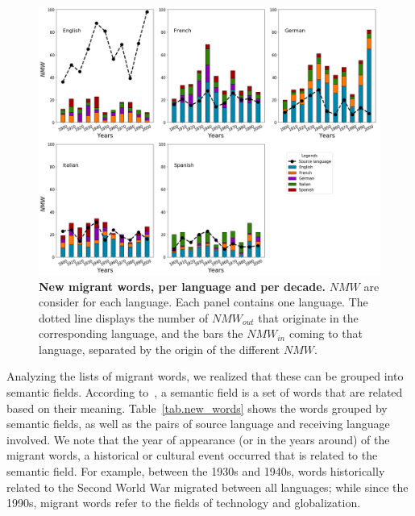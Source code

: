 \documentclass[10pt,letterpaper]{article} %
\begin{document}
\begin{figure} %
\begin{adjustwidth}{-1.2in}{0in}
\includegraphics[scale=.35]{NW_A_ejes.png}
\caption{{\bf New migrant words, per language and per decade.} 
$NMW$ are consider for each language. Each panel contains one language. 
The dotted line displays the number of $NMW_{out}$ that originate in the 
corresponding language, and the bars the $NMW_{in}$ coming to that language, 
separated by the origin of the different $NMW$. }
% 
\label{fig.NMW_A}
\end{adjustwidth}
\end{figure} %
	
Analyzing the lists  of 
migrant words, we realized that
these can be grouped into semantic fields. According to~\cite{semantic_oxford},
a semantic field is a set of words that are related based on their meaning.
Table~\ref{tab.new_words} shows the words grouped by semantic fields, as well as
the pairs of source language and receiving language involved. We note that the
year of appearance (or in the years around) of the migrant words, a historical
or cultural event occurred that is related to the semantic field. For example,
between the 1930s and 1940s, words historically related to the Second World War
migrated between all languages; while since the 1990s, migrant words refer
to the fields of technology and globalization.  
\end{document}
